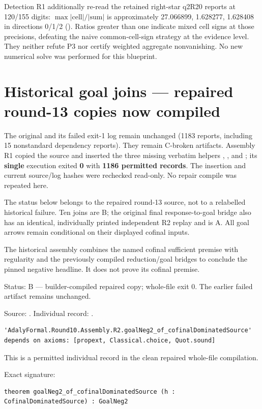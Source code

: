 Detection R1 additionally re-read the retained right-star q2R20 reports at 120/155 digits: \(\max|\mathrm{cell}|/|\mathrm{sum}|\) is approximately 27.066899, 1.628277, 1.628408 in directions 0/1/2 (\texttt{}). Ratios greater than one indicate mixed cell signs at those precisions, defeating the naive common-cell-sign strategy at the evidence level. They neither refute P3 nor certify weighted aggregate nonvanishing. No new numerical solve was performed for this blueprint.

\section{Historical goal joins — repaired round-13 copies now compiled}

The original \texttt{} and its failed exit-1 log remain unchanged (1183 reports, including 15 nonstandard dependency reports). They remain C-broken artifacts. Assembly R1 copied the source and inserted the three missing verbatim helpers \texttt{}, \texttt{}, and \texttt{}; its \textbf{single} \texttt{} execution exited \textbf{0} with \textbf{1186 permitted records}. The insertion and current source/log hashes were rechecked read-only. No repair compile was repeated here.

The status below belongs to the repaired round-13 source, not to a relabelled historical failure. Ten joins are B; the original final response-to-goal bridge also has an identical, individually printed independent R2 replay and is A. All goal arrows remain conditional on their displayed cofinal inputs.

\begin{theorem}
\label{join-1}
\leanok
The historical assembly combines the named cofinal sufficient premise with regularity and the previously compiled reduction/goal bridges to conclude the pinned negative headline. It does not prove its cofinal premise.
\par Status: B — builder-compiled repaired copy; whole-file exit 0. The earlier failed artifact remains unchanged.
\par Source: \texttt{}. Individual record: \texttt{}.
\begin{verbatim}
'AdalyFormal.Round10.Assembly.R2.goalNeg2_of_cofinalDominatedSource' depends on axioms: [propext, Classical.choice, Quot.sound]
\end{verbatim}
This is a permitted individual record in the clean repaired whole-file compilation.
\par Exact signature:
\begin{verbatim}
theorem goalNeg2_of_cofinalDominatedSource (h : CofinalDominatedSource) : GoalNeg2
\end{verbatim}
\end{theorem}

